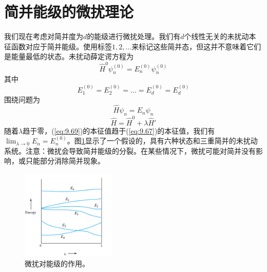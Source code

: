 \section{简并能级的微扰理论}
\label{sec:9.5 Perturbation Theory for a Degenerate Energy Level}
    我们现在考虑对简并度为$d$的能级进行微扰处理。我们有$d$个线性无关的未扰动本征函数对应于简并能级。使用标签$1,2,\ldots$来标记这些简并态，但这并不意味着它们是能量最低的状态。未扰动薛定谔方程为
    \begin{equation}
        \hat{H}^0\psi_n^{\left(0\right)} = E_n^{\left(0\right)}\psi_n^{\left(0\right)}
        \label{eq:9.67}
    \end{equation}
    其中
    \begin{equation}
        E_1^{\left(0\right)} = E_2^{\left(0\right)} = \ldots = E_d^{\left(0\right)} = E_d^{\left(0\right)}
        \label{eq:9.68}
    \end{equation}
    围绕问题为
    \begin{equation}
        \hat{H}\psi_n = E_n \psi_n
        \label{eq:9.69}
    \end{equation}
    \begin{equation}
        \hat{H} = \hat{H}^0 + \lambda\hat{H}'
        \label{eq:9.70}
    \end{equation}
    随着$\lambda$趋于零，(\ref{eq:9.69})的本征值趋于(\ref{eq:9.67})的本征值，我们有$\lim_{\lambda \to 0} E_n = E_n^{\left(0\right)}$。图\ref{fig:9.2}显示了一个假设的，具有六种状态和三重简并的未扰动系统。注意：微扰会导致简并能级的分裂。在某些情况下，微扰可能对简并没有影响，或只能部分消除简并现象。
    \begin{figure}[ht]
        \centering
        \includegraphics[width=0.4\textwidth]{Figures/9.2.png}
        \caption{微扰对能级的作用。}
        \label{fig:9.2}
    \end{figure}

